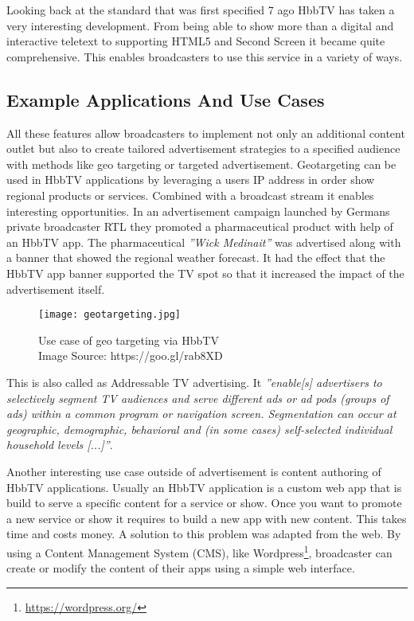 Looking back at the standard that was first specified 7 ago HbbTV has taken a very interesting
development. From being able to show more than a digital and interactive teletext to supporting
HTML5 and Second Screen it became quite comprehensive. This enables broadcasters to use this
service in a variety of ways.

\subsection{Example Applications And Use Cases}

All these features allow broadcasters to implement not only an additional content outlet but also
to create tailored advertisement strategies to a specified audience with methods like geo targeting
or targeted advertisement. Geotargeting can be used in HbbTV applications by leveraging a users
IP address in order show regional products or services. Combined with a broadcast stream it
enables interesting opportunities. In an advertisement campaign launched by Germans private
broadcaster RTL they promoted a pharmaceutical product with help of an HbbTV app. The pharmaceutical
\textit{''Wick Medinait''} was advertised along with a banner that showed the regional weather
forecast. It had the effect that the HbbTV app banner supported the TV spot so that it increased
the impact of the advertisement itself.

\begin{figure}[htb]
  \centering
  \texttt{[image: geotargeting.jpg]}\\
  \caption{
    Use case of geo targeting via HbbTV\\
    {\tiny Image Source: https://goo.gl/rab8XD}
  }
  \label{fig:geotargeting}
\end{figure}

This is also called as Addressable TV advertising. It \textit{''enable[s] advertisers to selectively
segment TV audiences and serve different ads or ad pods (groups of ads) within a common program or
navigation screen. Segmentation can occur at geographic, demographic, behavioral and (in some cases)
self-selected individual household levels [...]''}\cite{adrTV}.

Another interesting use case outside of advertisement is content authoring of HbbTV applications.
Usually an HbbTV application is a custom web app that is build to serve a specific content for
a service or show. Once you want to promote a new service or show it requires to build a new
app with new content. This takes time and costs money. A solution to this problem was adapted from
the web. By using a Content Management System (CMS), like Wordpress\footnote{\url{https://wordpress.org/}},
broadcaster can create or modify the content of their apps using a simple web interface.

